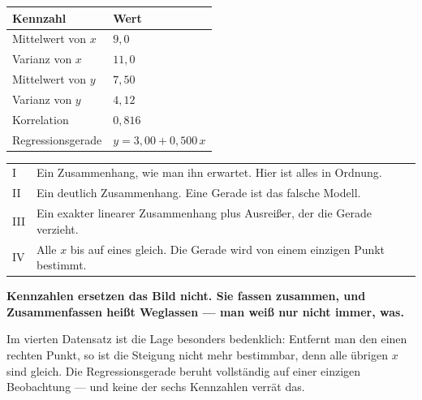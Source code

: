 \begin{merksatz}
\begin{center}
{\small
\renewcommand{\arraystretch}{1.42}
\begin{tabular}{@{}P{3.6cm}P{2.6cm}@{}}
\toprule
\textbf{Kennzahl} & \textbf{Wert}\\
\midrule
Mittelwert von $x$ & $9{,}0$\\
Varianz von $x$ & $11{,}0$\\
Mittelwert von $y$ & $7{,}50$\\
Varianz von $y$ & $4{,}12$\\
Korrelation & $0{,}816$\\
Regressionsgerade & $y = 3{,}00 + 0{,}500\,x$\\
\bottomrule
\end{tabular}}
\end{center}

\begin{center}
\renewcommand{\arraystretch}{1.5}
\begin{tabular}{@{}P{1.2cm}P{7.2cm}@{}}
\toprule
I & Ein Zusammenhang, wie man ihn erwartet. Hier ist alles in Ordnung.\\
II & Ein deutlich  Zusammenhang. Eine Gerade ist das falsche Modell.\\
III & Ein exakter linearer Zusammenhang plus  Ausreißer, der die Gerade verzieht.\\
IV & Alle $x$ bis auf eines gleich. Die Gerade wird von einem einzigen Punkt bestimmt.\\
\bottomrule
\end{tabular}
\end{center}
\end{merksatz}

\begin{warnung}
\begin{center}
\begin{minipage}{0.9\textwidth}
\textbf{Kennzahlen ersetzen das Bild nicht. Sie fassen zusammen, und Zusammenfassen heißt Weglassen --- man weiß nur nicht immer, was.}
\end{minipage}
\end{center}

Im vierten Datensatz ist die Lage besonders bedenklich: Entfernt man den einen rechten Punkt, so ist die Steigung nicht mehr bestimmbar, denn alle übrigen $x$ sind gleich. Die Regressionsgerade beruht vollständig auf einer einzigen Beobachtung --- und keine der sechs Kennzahlen verrät das.

\begin{center}
\begin{minipage}{0.88\textwidth}
\end{minipage}
\end{center}
\end{warnung}

